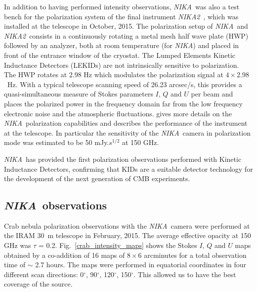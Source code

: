 \documentclass[twocolumn,traditabstract]{aa}
\def\NIKA{\textit{NIKA}}
\def\NIKAd{\textit{NIKA2}}
\begin{document}
In addition to having performed intensity observations, \NIKA\ was also a test
bench for the polarization system of the final instrument
\NIKAd\ \citep{calvo2016,catalano2016nika2,2017arXiv170700908A}, which was installed at the
telescope in October, 2015. The polarization setup of \NIKA\ and
\NIKAd\ consists in a continuously rotating a metal mesh half wave plate (HWP)
followed by an analyzer, both at room temperature (for \NIKA) and placed in
front of the entrance window of the cryostat. The Lumped Elements Kinetic
Inductance Detectors (LEKIDs) are not intrinsically sensitive to
polarization. The HWP rotates at 2.98 Hz which modulates the polarization signal
at $4\times 2.98$~Hz. With a typical telescope scanning speed of 26.23 arcsec/s,
this provides a quasi-simultaneous measure of Stokes parameters $I$, $Q$ and $U$
per beam and
places the polarized power in the frequency domain far from the low frequency
electronic noise and the atmospheric fluctuations. \cite{ritacco2017} gives more
details on the \NIKA\ polarization capabilities and describes the performance of
the instrument at the telescope. In particular the sensitivity of the
\NIKA\ camera in polarization mode was estimated to be 50 mJy.$s^{1/2}$ at 150
GHz.

\NIKA\ has provided the first polarization
observations performed with Kinetic Inductance Detectors, confirming that KIDs are a
suitable detector technology for the development of the next generation of CMB
experiments.

\subsection{\NIKA\ observations}\label{sec:nika_observations}
Crab nebula polarization observations with the \NIKA\ camera were performed at
the IRAM 30~m telescope in February, 2015. The average effective opacity at 150 GHz was $\tau$ = 0.2.  Fig.~\ref{crab_intensity_maps} shows
the Stokes $I$, $Q$ and $U$ maps obtained by a co-addition of 16 maps
of $8 \times 6$ arcminutes for a total observation time of $\sim$ 2.7 hours. The
maps were performed in equatorial coordinates in four different scan
directions: 0$^{\circ}$, 90$^{\circ}$, 120$^{\circ}$, 150$^{\circ}$. This
allowed us to have the best coverage of the source.%
\end{document}
